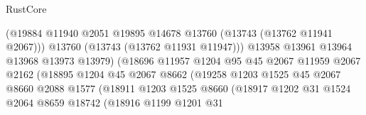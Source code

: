 \begin{lexlean}{RustCore}
\begin{coremodule}
                                          (@19884
                                            @11940
                                            @2051
                                            @19895
                                            @14678
                                            @13760
                                            (@13743 (@13762 @11941 @2067)))
                                          @13760
                                          (@13743 (@13762 @11931 @11947)))
                                        @13958
                                        @13961
                                        @13964
                                        @13968
                                        @13973
                                        @13979)
                                      (@18696
                                        @11957
                                        @1204
                                        @95
                                        @45
                                        @2067
                                        @11959
                                        @2067
                                        @2162
                                        (@18895
                                          @1204
                                          @45
                                          @2067
                                          @8662
                                          (@19258
                                            @1203
                                            @1525
                                            @45
                                            @2067
                                            @8660
                                            @2088
                                            @1577
                                            (@18911
                                              @1203
                                              @1525
                                              @8660
                                              (@18917
                                                @1202
                                                @31
                                                @1524
                                                @2064
                                                @8659
                                                @18742
                                                (@18916
                                                  @1199
                                                  @1201
                                                  @31

\end{coremodule}
\end{lexlean}
